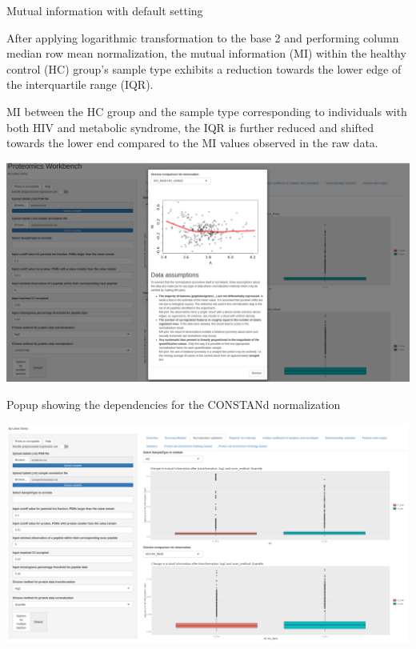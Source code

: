 \documentclass[
  11pt,
]{article}
\let\origfigure\figure
\begin{document}
\caption{Mutual information with default setting}\label{fig:ui_mutual_info_default}
 \endfigure\egroup

After applying logarithmic transformation to the base 2 and performing
column median row mean normalization, the mutual information (MI) within
the healthy control (HC) group's sample type exhibits a reduction
towards the lower edge of the interquartile range (IQR).

MI between the HC group and the sample type corresponding to individuals
with both HIV and metabolic syndrome, the IQR is further reduced and
shifted towards the lower end compared to the MI values observed in the
raw data.

\newpage
\bgroup  \origfigure[H] 

{\centering \includegraphics[width=1\linewidth]{screenshots/constand_norm_dependency} 

}

\caption{Popup showing the dependencies for the CONSTANd normalization}\label{fig:ui_constand_norm}
 \endfigure\egroup

\newpage
\bgroup  \origfigure[H] 

{\centering \includegraphics[width=1\linewidth]{screenshots/mutual_info_quant_norm} 

}
\end{document}
